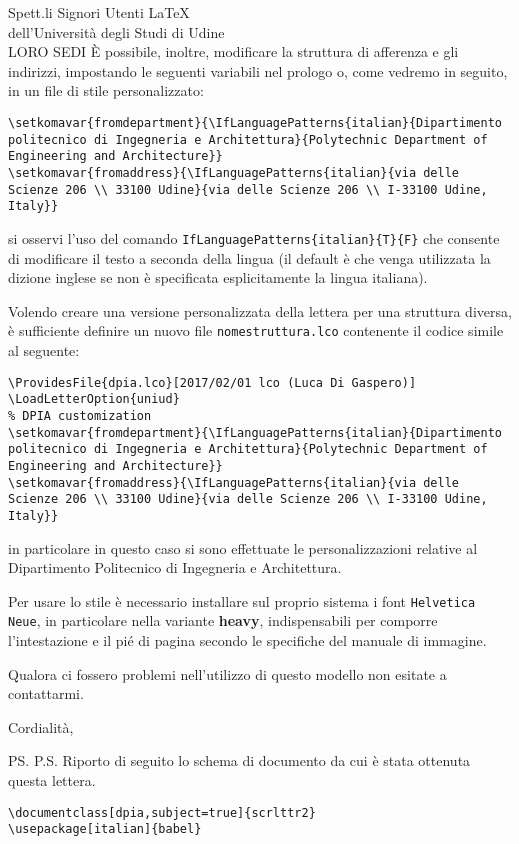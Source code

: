 \documentclass[dpia,subject=true]{scrlttr2}
\begin{document}
\begin{letter}{Spett.li Signori Utenti \LaTeX \\
    dell'Università degli Studi di Udine \\
    \MakeUppercase{Loro Sedi}
    }
    È possibile, inoltre, modificare la struttura di afferenza e gli indirizzi, impostando le seguenti variabili nel prologo o, come vedremo in seguito, in un file di stile personalizzato:
\begin{lstlisting}
\setkomavar{fromdepartment}{\IfLanguagePatterns{italian}{Dipartimento politecnico di Ingegneria e Architettura}{Polytechnic Department of Engineering and Architecture}}
\setkomavar{fromaddress}{\IfLanguagePatterns{italian}{via delle Scienze 206 \\ 33100 Udine}{via delle Scienze 206 \\ I-33100 Udine, Italy}}
\end{lstlisting}
  si osservi l'uso del comando \lstinline|IfLanguagePatterns{italian}{T}{F}| che consente di modificare il testo a seconda della lingua (il default è che venga utilizzata la dizione inglese se non è specificata esplicitamente la lingua italiana).
  
  Volendo creare una versione personalizzata della lettera per una struttura diversa, è sufficiente definire un nuovo file \texttt{nomestruttura.lco} contenente il codice simile al seguente:
\begin{lstlisting}
\ProvidesFile{dpia.lco}[2017/02/01 lco (Luca Di Gaspero)]
\LoadLetterOption{uniud}
% DPIA customization
\setkomavar{fromdepartment}{\IfLanguagePatterns{italian}{Dipartimento politecnico di Ingegneria e Architettura}{Polytechnic Department of Engineering and Architecture}}
\setkomavar{fromaddress}{\IfLanguagePatterns{italian}{via delle Scienze 206 \\ 33100 Udine}{via delle Scienze 206 \\ I-33100 Udine, Italy}}
\end{lstlisting}
   in particolare in questo caso si sono effettuate le personalizzazioni relative al Dipartimento Politecnico di Ingegneria e Architettura.
  
    Per usare lo stile è necessario installare sul proprio sistema i font \texttt{Helvetica Neue},  in particolare nella variante \textbf{heavy}, indispensabili per comporre l'intestazione e il pié di pagina secondo le specifiche del manuale di immagine.
    
    Qualora ci fossero problemi nell'utilizzo di questo modello non esitate a contattarmi.

    \closing{Cordialità,}
    \vfill
    \ps{P.S. Riporto di seguito lo schema di documento da cui è stata ottenuta questa lettera.}
\begin{lstlisting}
\documentclass[dpia,subject=true]{scrlttr2}
\usepackage[italian]{babel}


\end{lstlisting}
\end{letter}
\end{document}
